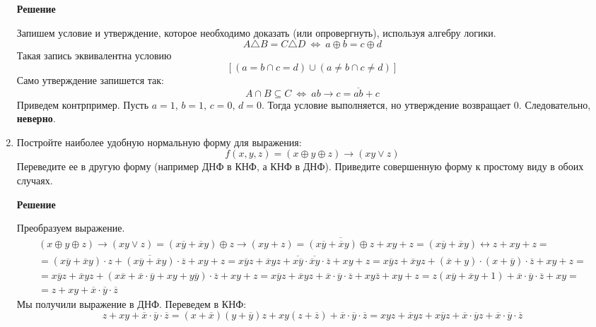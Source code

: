 \documentclass[12pt]{article}
\begin{document}
\begin{enumerate}[label={\textbf{\arabic{section}.\arabic*}}]
		\textbf{Решение}
		
		Запишем условие и утверждение, которое необходимо доказать (или опровергнуть), используя алгебру логики.
		$$
		A\triangle B = C\triangle D ~\Leftrightarrow~ a\oplus b = c\oplus d
		$$ 
		Такая запись эквивалентна условию
		$$
		\left[(a = b \cap c = d)\cup(a\neq b \cap c\neq d)\right]
		$$
		Само утверждение запишется так:
		$$
		A\cap B\subseteq C~\Leftrightarrow~ab\rightarrow c = \overline{ab} + c
		$$
		Приведем контрпример. Пусть $a=1$, $b=1$, $c=0$, $d=0$. Тогда условие выполняется, но утверждение возвращает $0$. Следовательно, \textbf{неверно}.
		\item Постройте наиболее удобную нормальную форму для выражения: 
		$$
		f(x,y,z) = (x\oplus y\oplus z)\rightarrow (xy\vee z)
		$$
		Переведите ее в другую форму (например ДНФ в КНФ, а КНФ в ДНФ). Приведите совершенную форму к простому виду в обоих случаях. 
		
		\textbf{Решение}
		
		Преобразуем выражение.
		\begin{multline*}
			(x\oplus y\oplus z)\rightarrow (xy\vee z) = (x\overline{y}+\overline{x}y)\oplus z\rightarrow (xy + z) = \overline{(x\overline{y}+\overline{x}y)\oplus z} + xy + z = (x\overline{y}+\overline{x}y)\leftrightarrow z + xy + z = \\
			= (x\overline{y}+\overline{x}y)\cdot z + \overline{(x\overline{y}+\overline{x}y)}\cdot\overline{z} +xy + z = x\overline{y}z + \overline{x}yz + \overline{x\overline{y}} \cdot \overline{\overline{x}y}\cdot \overline{z} + xy + z = x\overline{y}z + \overline{x}yz + (\overline{x} + y) \cdot (x + \overline{y})\cdot\overline{z} +xy + z = \\
			= x\overline{y}z + \overline{x}yz + (x\overline{x}+\overline{x}\cdot\overline{y}+xy+y\overline{y})\cdot\overline{z} + xy + z = x\overline{y}z + \overline{x}yz + \overline{x}\cdot\overline{y}\cdot\overline{z}+ xy\overline{z} + xy + z = z(x\overline{y} + \overline{x}y + 1) +  \overline{x}\cdot\overline{y}\cdot\overline{z}+ xy = \\
			= z + xy + \overline{x}\cdot\overline{y}\cdot\overline{z}
		\end{multline*}
		Мы получили выражение в ДНФ. Переведем в КНФ:
		$$
		z + xy + \overline{x}\cdot\overline{y}\cdot\overline{z} = (x+\overline{x})(y+\overline{y})z+xy(z+\overline{z})+\overline{x}\cdot\overline{y}\cdot\overline{z} = xyz + \overline{x}yz+x\overline{y}z+\overline{x}\cdot\overline{y}z + \overline{x}\cdot\overline{y}\cdot\overline{z}
		$$
	\end{enumerate}
	\newpage
\end{document}
